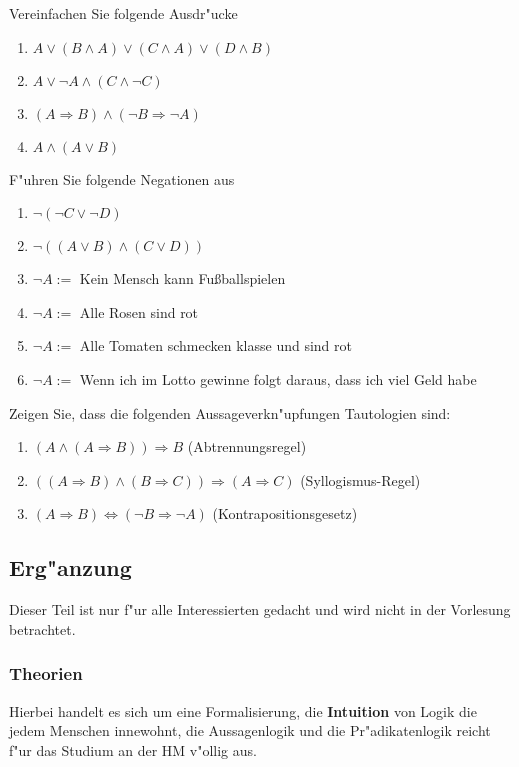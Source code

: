 Vereinfachen Sie folgende Ausdr"ucke
\begin{enumerate}
	\item $A \lor (B \land A) \lor (C \land A) \lor (D \land B)$
	\item $A \lor \neg A \land (C \land \neg C)$
	\item $(A \Rightarrow B) \land (\neg B \Rightarrow \neg A)$
	\item $A \land (A \lor B)$
\end{enumerate}

F"uhren Sie folgende Negationen aus
\begin{enumerate}
	\item $\neg (\neg C \lor \neg D)$
	\item $\neg ((A \lor B) \land (C \lor D))$
	\item $\neg A := $ Kein Mensch kann Fu{\ss}ballspielen
	\item $\neg A := $ Alle Rosen sind rot
	\item $\neg A := $ Alle Tomaten schmecken klasse und sind rot
	\item $\neg A := $ Wenn ich im Lotto gewinne folgt daraus, dass ich viel Geld habe
\end{enumerate}

Zeigen Sie, dass die folgenden Aussageverkn"upfungen Tautologien sind:
\begin{enumerate}
	\item $(A \land (A \Rightarrow B)) \Rightarrow B$ (Abtrennungsregel)
	\item $((A \Rightarrow B) \land (B \Rightarrow C)) \Rightarrow (A \Rightarrow C)$ (Syllogismus-Regel)
	\item $(A \Rightarrow B) \iff (\neg B \Rightarrow \neg A)$ (Kontrapositionsgesetz)
\end{enumerate}

\subsection{Erg"anzung}
Dieser Teil ist nur f"ur alle Interessierten gedacht und wird nicht in der Vorlesung betrachtet.

\subsubsection*{Theorien}
Hierbei handelt es sich um eine Formalisierung, die \textbf{Intuition} von Logik die jedem Menschen innewohnt, die Aussagenlogik und die Pr"adikatenlogik reicht f"ur das Studium an der HM v"ollig aus. 

